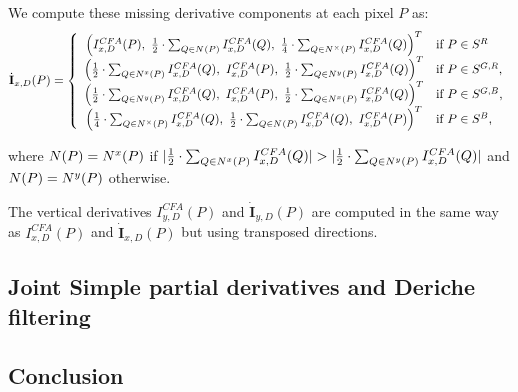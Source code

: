 \documentclass[twoside]{article}
\begin{document}
\noindent We compute these missing derivative components at each pixel $P$ as:
\begin{equation}
\dot{\textbf{I}}_{x,D}(P) = \left\lbrace
\begin{array}{cl}
\left( I_{x,D}^{CFA}(P), ~\frac{1}{2}\cdot\sum_{Q \in N^{}(P)} I_{x,D}^{CFA}(Q),~\frac{1}{4}\cdot\sum_{Q \in N^{\times}(P)} I_{x,D}^{CFA}(Q) \right)^T & \text{if $P \in S^R$} \\
\left( \frac{1}{2}\cdot\sum_{Q \in N^{x}(P)} I_{x,D}^{CFA}(Q),~I_{x,D}^{CFA}(P),~\frac{1}{2}\cdot\sum_{Q \in N^{y}(P)} I_{x,D}^{CFA}(Q) \right)^T & \text{if $P \in S^{G,R}$,}\\
\left( \frac{1}{2}\cdot\sum_{Q \in N^{y}(P)} I_{x,D}^{CFA}(Q),~I_{x,D}^{CFA}(P),~\frac{1}{2}\cdot\sum_{Q \in N^{x}(P)} I_{x,D}^{CFA}(Q) \right)^T & \text{if $P \in S^{G,B}$,}\\
\left( \frac{1}{4}\cdot\sum_{Q \in N^{\times}(P)} I_{x,D}^{CFA}(Q),~\frac{1}{2}\cdot\sum_{Q \in N^{}(P)} I_{x,D}^{CFA}(Q),~I_{x,D}^{CFA}(P) \right)^T & \text{if $P \in S^B$,}
\end{array}\right.
\label{eq:I^D1_p_x_full}
\end{equation}

\noindent where $N(P)=N^{x}(P)$ if $|\frac{1}{2}\cdot\sum_{Q \in \N{x}(P)} I_{x,D}^{CFA}(Q)|>|\frac{1}{2}\cdot\sum_{Q \in \N{y}(P)} I_{x,D}^{CFA}(Q)|$ and $N(P)=N^{y}(P)$ otherwise.

The vertical derivatives $I_{y,D}^{CFA}(P)$ and $\dot{\textbf{I}}_{y,D}(P)$ are computed in the same way as $I_{x,D}^{CFA}(P)$ and  $\dot{\textbf{I}}_{x,D}(P)$ but using transposed directions.


\subsection{Joint Simple partial derivatives and Deriche filtering}
\label{Joint Simple partial derivatives and Deriche filtering}






\subsection{Conclusion}
\label{Conclusion}
\end{document}
